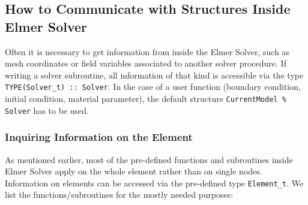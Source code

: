 \subsection{How to Communicate with Structures Inside Elmer Solver\label{programming:solvercommunication}}
Often it is necessary to get information from inside the Elmer Solver, such as mesh coordinates or field variables associated to another solver procedure. If writing a solver subroutine, all information of that kind is accessible via the type \texttt{TYPE(Solver\_t) :: Solver}. In the case of a user function (boundary condition, initial condition, material parameter), the default structure \texttt{CurrentModel \% Solver} has to be used.
\subsubsection{Inquiring Information on the Element}
As mentioned earlier, most of the pre-defined functions and subroutines inside Elmer Solver apply on the whole element rather than on single nodes. Information on elements can be accessed via the pre-defined type \texttt{Element\_t}. We list the functions/subroutines for the mostly needed purposes:
